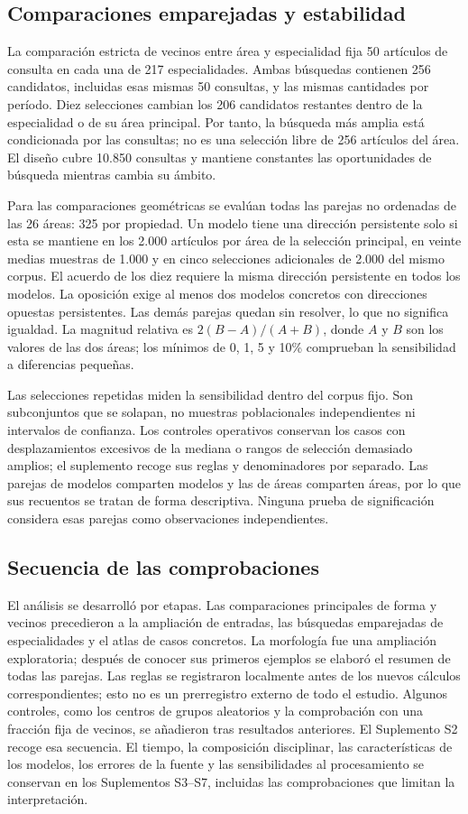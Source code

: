 \documentclass[12pt]{article}
\begin{document}
\subsection{Comparaciones emparejadas y estabilidad}
La comparación estricta de vecinos entre área y especialidad fija 50 artículos de consulta en cada una de 217 especialidades. Ambas búsquedas contienen 256 candidatos, incluidas esas mismas 50 consultas, y las mismas cantidades por período. Diez selecciones cambian los 206 candidatos restantes dentro de la especialidad o de su área principal. Por tanto, la búsqueda más amplia está condicionada por las consultas; no es una selección libre de 256 artículos del área. El diseño cubre 10.850 consultas y mantiene constantes las oportunidades de búsqueda mientras cambia su ámbito.

Para las comparaciones geométricas se evalúan todas las parejas no ordenadas de las 26 áreas: 325 por propiedad. Un modelo tiene una dirección persistente solo si esta se mantiene en los 2.000 artículos por área de la selección principal, en veinte medias muestras de 1.000 y en cinco selecciones adicionales de 2.000 del mismo corpus. El acuerdo de los diez requiere la misma dirección persistente en todos los modelos. La oposición exige al menos dos modelos concretos con direcciones opuestas persistentes. Las demás parejas quedan sin resolver, lo que no significa igualdad. La magnitud relativa es $2(B-A)/(A+B)$, donde $A$ y $B$ son los valores de las dos áreas; los mínimos de 0, 1, 5 y 10\% comprueban la sensibilidad a diferencias pequeñas.

Las selecciones repetidas miden la sensibilidad dentro del corpus fijo. Son subconjuntos que se solapan, no muestras poblacionales independientes ni intervalos de confianza. Los controles operativos conservan los casos con desplazamientos excesivos de la mediana o rangos de selección demasiado amplios; el suplemento recoge sus reglas y denominadores por separado. Las parejas de modelos comparten modelos y las de áreas comparten áreas, por lo que sus recuentos se tratan de forma descriptiva. Ninguna prueba de significación considera esas parejas como observaciones independientes.

\subsection{Secuencia de las comprobaciones}
El análisis se desarrolló por etapas. Las comparaciones principales de forma y vecinos precedieron a la ampliación de entradas, las búsquedas emparejadas de especialidades y el atlas de casos concretos. La morfología fue una ampliación exploratoria; después de conocer sus primeros ejemplos se elaboró el resumen de todas las parejas. Las reglas se registraron localmente antes de los nuevos cálculos correspondientes; esto no es un prerregistro externo de todo el estudio. Algunos controles, como los centros de grupos aleatorios y la comprobación con una fracción fija de vecinos, se añadieron tras resultados anteriores. El Suplemento S2 recoge esa secuencia. El tiempo, la composición disciplinar, las características de los modelos, los errores de la fuente y las sensibilidades al procesamiento se conservan en los Suplementos S3--S7, incluidas las comprobaciones que limitan la interpretación.
\end{document}
